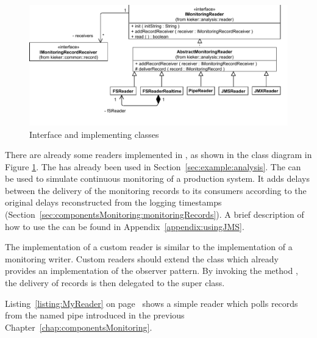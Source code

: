 \begin{figure}[h]\centering
\includegraphics[scale=0.7]{images/kieker_readerimplsuserguide-modified}
\caption{Interface  and implementing classes}
\label{Figure:ReaderHierarchy}
\end{figure}

\pagebreak

% 
% 


\noindent There are already some readers implemented in \Kieker,  as shown in the %
class diagram in Figure \ref{Figure:ReaderHierarchy}. %
The  has already been used in Section~\ref{sec:example:analysis}. %
The  can be used to simulate continuous monitoring of a %
production system. It adds delays between the delivery of the monitoring records %
to its consumers according to the original delays reconstructed from the logging %
timestamps (Section~\ref{sec:componentsMonitoring:monitoringRecords}).
A brief description of how to use the  can be found in Appendix~\ref{appendix:usingJMS}. %

\noindent The implementation of a custom reader is similar to the implementation of a %
monitoring writer. Custom readers should extend the class  %
which already provides an implementation of the observer pattern. %
By invoking the method ,  the delivery of records is then %
delegated to the super class.

Listing~\ref{listing:MyReader} on page~\pageref{listing:MyReader} shows a simple reader which polls records from %
the named pipe introduced in the previous Chapter~\ref{chap:componentsMonitoring}. %

